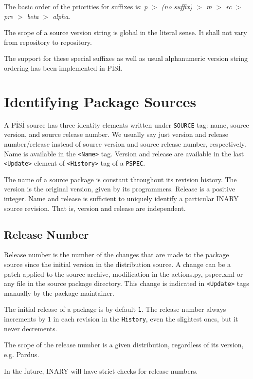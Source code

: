 \documentclass[a4paper,11pt]{article}
\begin{document}
The basic order of the priorities for suffixes is:\newline
\emph{p $>$ (no suffix) $>$ m $>$ rc $>$ pre $>$ beta $>$ alpha}.

The scope of a source version string is global in the literal
sense. It shall not vary from repository to repository.

The support for these special suffixes as well as usual alphanumeric
version string ordering has been implemented in P\.IS\.I.

\section{Identifying Package Sources}

A P\.IS\.I source has three identity elements written under
\texttt{SOURCE} tag: name, source version, and source release number.
We usually say just version and release number/release instead of
source version and source release number, respectively. Name is available in
the \texttt{<Name>} tag. Version and release are available in the last
\texttt{<Update>} element of \texttt{<History>} tag of a \texttt{PSPEC}.

The name of a source package is constant throughout its revision
history. The version is the original version, given by its
programmers. Release is a positive integer.  Name and release
is sufficient to uniquely identify a particular INARY source revision.
That is, version and release are independent.

\subsection{Release Number}

Release number is the number of the changes that are made to the
package source since the initial version in the distribution source. A
change can be a patch applied to the source archive, modification in
the actions.py, pspec.xml or any file in the source package
directory. This change is indicated in \texttt{<Update>} tags manually
by the package maintainer.

The initial release of a package is by default \texttt{1}. The release
number always increments by $1$ in each revision in the
\texttt{History}, even the slightest ones, but it never decrements.

The scope of the release number is a given distribution, regardless of
its version, e.g. Pardus.

In the future, INARY will have strict checks for release numbers.
\end{document}
